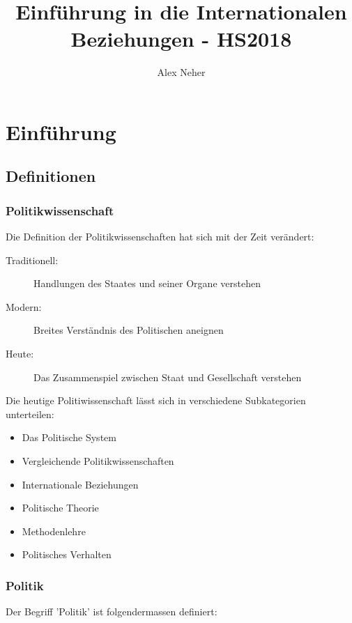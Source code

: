 \documentclass[a4paper, 11pt]{article}
\begin{document}
 
\title{Einführung in die Internationalen Beziehungen - HS2018}
\author{Alex Neher}
\maketitle

\tableofcontents
\newpage
\listoffigures
\newpage

\graphicspath{{./Pictures/}}


\section{Einführung}
\subsection{Definitionen}
\subsubsection{Politikwissenschaft}
Die Definition der Politikwissenschaften hat sich mit der Zeit verändert:
\begin{description}
    \item[Traditionell:] Handlungen des Staates und seiner Organe verstehen
    \item[Modern:] Breites Verständnis des Politischen aneignen
    \item[Heute:] Das Zusammenspiel zwischen Staat und Gesellschaft verstehen
\end{description}        

\vspace{10px}
\noindent Die heutige Politiwissenschaft lässt sich in verschiedene Subkategorien unterteilen:
\begin{multicols}{2}
    \begin{itemize}
        \item Das Politische System
        \item Vergleichende Politikwissenschaften
        \item Internationale Beziehungen
\columnbreak
        \item Politische Theorie
        \item Methodenlehre
        \item Politisches Verhalten
    \end{itemize}
\end{multicols}

\subsubsection{Politik}
Der Begriff 'Politik' ist folgendermassen definiert:
\end{document}
